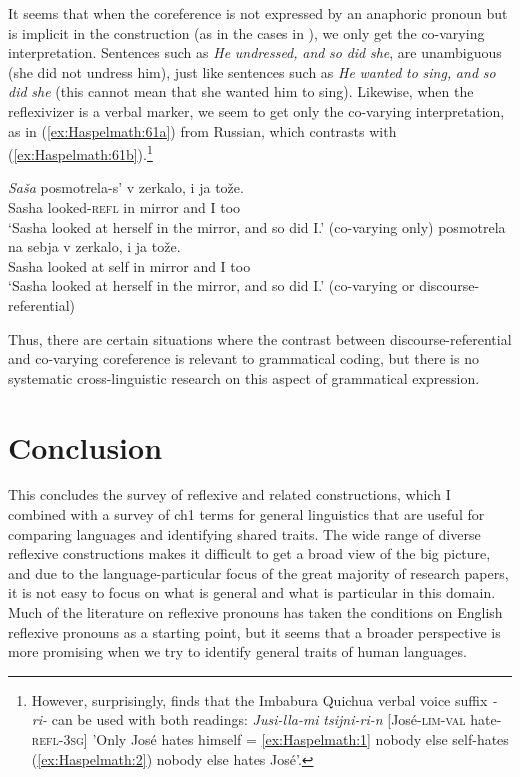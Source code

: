 \documentclass[output=paper]{langscibook}
\begin{document}
It seems that when the coreference is not expressed by an anaphoric pronoun but is implicit in the construction (as in the cases in ), we only get the co-varying interpretation. Sentences such as \textit{He} \textit{undressed,} \textit{and} \textit{so} \textit{did} \textit{she}, are unambiguous (she did not undress him), just like sentences such as \textit{He} \textit{wanted} \textit{to} \textit{sing,} \textit{and} \textit{so} \textit{did} \textit{she} (this cannot mean that she wanted him to sing). Likewise, when the reflexivizer is a verbal marker, we seem to get only the co-varying interpretation, as in (\ref{ex:Haspelmath:61a}) from Russian, which contrasts with (\ref{ex:Haspelmath:61b}).\footnote{ {However, surprisingly, \citet{Kapitonov2014} finds that the Imbabura Quichua verbal voice suffix} {\textit{{}-ri-}} {can be used with both readings:} {\textit{Jusi-lla-mi} \textit{tsijni-ri-n}} {[José-}{\textsc{lim-val}} {hate-}{\textsc{refl-3sg}}{] ’Only José hates himself = \ref{ex:Haspelmath:1} nobody else self-hates (\ref{ex:Haspelmath:2}) nobody else hates José’.}}

\ea%
    \label{ex:Haspelmath:61}
    \ea \label{ex:Haspelmath:61a}
    \gll  \textit{Saša}  {posmotrela-s’}  {v}  {zerkalo,}    {i}  {ja}  {tože.}\\
       Sasha  looked-\textsc{refl}  in  mirror    and  I  too \\
    \glt‘Sasha looked at herself in the mirror, and so did I.’ (co-varying only)
    \ex \label{ex:Haspelmath:61b}
      {posmotrela}  {na}  {sebja}  {v}  {zerkalo,}    {i}  {ja}  {tože.}\\
    Sasha  looked  at  self  in  mirror    and  I  too\\
    \glt   ‘Sasha looked at herself in the mirror, and so did I.’ (co-varying or discourse-referential)
    \z
\z 
 

Thus, there are certain situations where the contrast between discourse-referential and co-varying coreference is relevant to grammatical coding, but there is no systematic cross-linguistic research on this aspect of grammatical expression.

\section{Conclusion}\label{sec:Haspelmath:14}
This concludes the survey of reflexive and related constructions, which I combined with a survey of ch1 terms for general linguistics that are useful for comparing languages and identifying shared traits. The wide range of diverse reflexive constructions makes it difficult to get a broad view of the big picture, and due to the language-particular focus of the great majority of research papers, it is not easy to focus on what is general and what is particular in this domain. Much of the literature on reflexive pronouns has taken the conditions on English reflexive pronouns as a starting point, but it seems that a broader perspective is more promising when we try to identify general traits of human languages.
\end{document}
